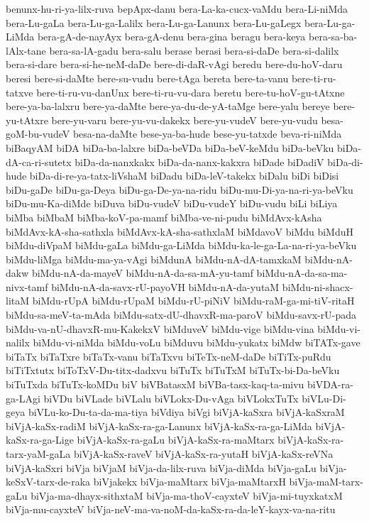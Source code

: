 {benunx-hu-ri-ya-lilx-ruva
bepApx-danu
bera-La-ka-cucx-vaMdu
bera-Li-niMda
bera-Lu-gaLa
bera-Lu-ga-Lalilx
bera-Lu-ga-Lanunx
bera-Lu-gaLegx
bera-Lu-ga-LiMda
bera-gA-de-nayAyx
bera-gA-denu
bera-gina
beragu
bera-keya
bera-sa-ba-lAlx-tane
bera-sa-lA-gadu
bera-salu
berase
berasi
bera-si-daDe
bera-si-dalilx
bera-si-dare
bera-si-he-neM-daDe
bere-di-daR-vAgi
beredu
bere-du-hoV-daru
beresi
bere-si-daMte
bere-su-vudu
bere-tAga
bereta
bere-ta-vanu
bere-ti-ru-tatxve
bere-ti-ru-vu-danUnx
bere-ti-ru-vu-dara
beretu
bere-tu-hoV-gu-tAtxne
bere-ya-ba-lalxru
bere-ya-daMte
bere-ya-du-de-yA-taMge
bere-yalu
bereye
bere-yu-tAtxre
bere-yu-varu
bere-yu-vu-dakekx
bere-yu-vudeV
bere-yu-vudu
besa-goM-bu-vudeV
besa-na-daMte
bese-ya-ba-hude
bese-yu-tatxde
beva-ri-niMda
biBaqyAM
biDA
biDa-ba-lalxre
biDa-beVDa
biDa-beV-keMdu
biDa-beVku
biDa-dA-ca-ri-sutetx
biDa-da-nanxkakx
biDa-da-nanx-kakxra
biDade
biDadiV
biDa-di-hude
biDa-di-re-ya-tatx-liVshaM
biDadu
biDa-leV-takekx
biDalu
biDi
biDisi
biDu-gaDe
biDu-ga-Deya
biDu-ga-De-ya-na-ridu
biDu-mu-Di-ya-na-ri-ya-beVku
biDu-mu-Ka-diMde
biDuva
biDu-vudeV
biDu-vudeY
biDu-vudu
biLi
biLiya
biMba
biMbaM
biMba-koV-pa-mamf
biMba-ve-ni-pudu
biMdAvx-kAsha
biMdAvx-kA-sha-sathxla
biMdAvx-kA-sha-sathxlaM
biMdavoV
biMdu
biMduH
biMdu-diVpaM
biMdu-gaLa
biMdu-ga-LiMda
biMdu-ka-le-ga-La-na-ri-ya-beVku
biMdu-liMga
biMdu-ma-ya-vAgi
biMdunA
biMdu-nA-dA-tamxkaM
biMdu-nA-dakw
biMdu-nA-da-mayeV
biMdu-nA-da-sa-mA-yu-tamf
biMdu-nA-da-sa-ma-nivx-tamf
biMdu-nA-da-savx-rU-payoVH
biMdu-nA-da-yutaM
biMdu-ni-shacx-litaM
biMdu-rUpA
biMdu-rUpaM
biMdu-rU-piNiV
biMdu-raM-ga-mi-tiV-ritaH
biMdu-sa-meV-ta-mAda
biMdu-satx-dU-dhavxR-ma-paroV
biMdu-savx-rU-pada
biMdu-va-nU-dhavxR-mu-KakekxV
biMduveV
biMdu-vige
biMdu-vina
biMdu-vi-nalilx
biMdu-vi-niMda
biMdu-voLu
biMduvu
biMdu-yukatx
biMdw
biTATx-gave
biTaTx
biTaTxre
biTaTx-vanu
biTaTxvu
biTeTx-neM-daDe
biTiTx-puRdu
biTiTxtutx
biToTxV-Du-titx-dadxvu
biTuTx
biTuTxM
biTuTx-bi-Da-beVku
biTuTxda
biTuTx-koMDu
biV
biVBatasxM
biVBa-tasx-kaq-ta-mivu
biVDA-ra-ga-LAgi
biVDu
biVLade
biVLalu
biVLokx-Du-vAga
biVLokxTuTx
biVLu-Di-geya
biVLu-ko-Du-ta-da-ma-tiya
biVdiya
biVgi
biVjA-kaSxra
biVjA-kaSxraM
biVjA-kaSx-radiM
biVjA-kaSx-ra-ga-Lanunx
biVjA-kaSx-ra-ga-LiMda
biVjA-kaSx-ra-ga-Lige
biVjA-kaSx-ra-gaLu
biVjA-kaSx-ra-maMtarx
biVjA-kaSx-ra-tarx-yaM-gaLa
biVjA-kaSx-raveV
biVjA-kaSx-ra-yutaH
biVjA-kaSx-reVNa
biVjA-kaSxri
biVja
biVjaM
biVja-da-lilx-ruva
biVja-diMda
biVja-gaLu
biVja-keSxV-tarx-de-raka
biVjakekx
biVja-maMtarx
biVja-maMtarxH
biVja-maM-tarx-gaLu
biVja-ma-dhayx-sithxtaM
biVja-ma-thoV-cayxteV
biVja-mi-tuyxkatxM
biVja-mu-cayxteV
biVja-neV-ma-va-noM-da-kaSx-ra-da-leY-kayx-va-na-ritu
}

